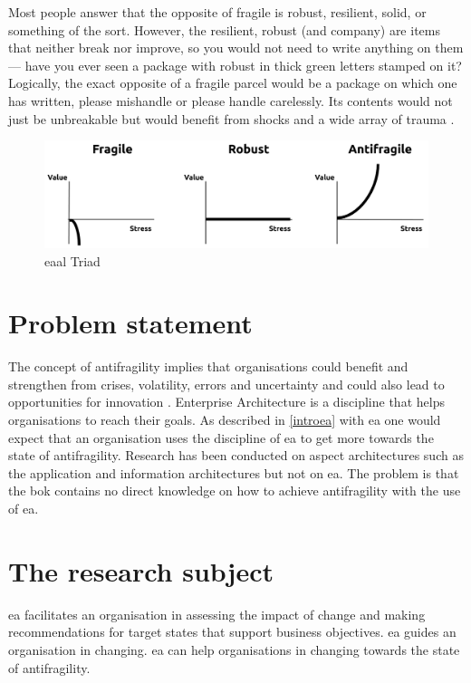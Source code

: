 Most people answer that the opposite of \gls{fragile} is \gls{robust}, \gls{resilient}, solid, or something of the sort. However, the \gls{resilient}, \gls{robust} (and company) are items that neither break nor improve, so you would not need to write anything on them — have you ever seen a package with \gls{robust} in thick green letters stamped on it? Logically, the exact opposite of a \gls{fragile} parcel would be a package on which one has written, please mishandle or please handle carelessly. Its contents would not just be unbreakable but would benefit from shocks and a wide array of trauma \parencite{Taleb2012}.

\begin{figure}[h!]
	\centering
	\includegraphics[width=0.7\linewidth]{images/eaal-triad}
	\caption[EAAL Triad]{\acrshort{eaal} Triad \parencite{Botjes2020}}
	\label{fig:eaal-triad}
\end{figure}

\section{Problem statement}
\label{sec:problemstatement}
The concept of \gls{antifragility} implies that organisations could benefit and strengthen from crises, volatility, errors and uncertainty and could also lead to opportunities for innovation \parencite{Kastner2017}. Enterprise Architecture is a discipline that helps organisations to reach their goals. As described in \ref{introea} with \acrshort{ea} one would expect that an organisation uses the discipline of \acrshort{ea} to get more towards the state of \gls{antifragility}. Research has been conducted on aspect architectures such as the application and information architectures but not on \acrshort{ea}. The problem is that the \acrlong{bok} contains no direct knowledge on how to achieve \gls{antifragility} with the use of \acrshort{ea}. 

\section{The research subject}
\label{sec:researchsubject}
\acrshort{ea} facilitates an organisation in assessing the impact of change and making recommendations for target states that support business objectives. \acrshort{ea} guides an organisation in changing. \acrshort{ea} can help organisations in changing towards the state of \gls{antifragility}.


